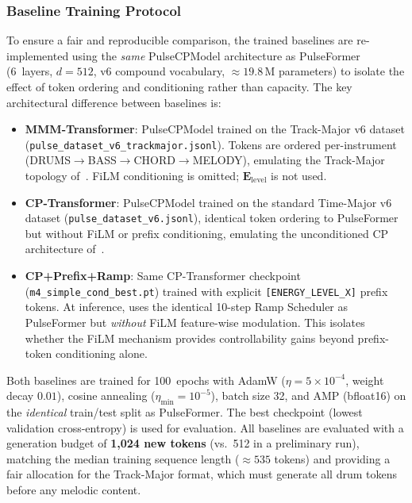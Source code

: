 \documentclass[pdflatex,sn-mathphys-num,twocolumn]{sn-jnl}
\theoremstyle{thmstyleone}
\theoremstyle{thmstyletwo}
\begin{document}
\subsubsection*{Baseline Training Protocol}
\label{sec:baseline_protocol}
To ensure a fair and reproducible comparison, the trained baselines are re-implemented using the \emph{same} PulseCPModel architecture as PulseFormer (6~layers, $d=512$, v6 compound vocabulary, $\approx\!19.8\,\mathrm{M}$ parameters) to isolate the effect of token ordering and conditioning rather than capacity. The key architectural difference between baselines is:

\begin{itemize}[nosep,leftmargin=*]
  \item \textbf{MMM-Transformer}: PulseCPModel trained on the Track-Major v6 dataset (\texttt{pulse\_dataset\_v6\_trackmajor.jsonl}). Tokens are ordered per-instrument (DRUMS$\to$BASS$\to$CHORD$\to$MELODY), emulating the Track-Major topology of~\cite{ens2020mmm}. FiLM conditioning is omitted; $\mathbf{E}_{\mathrm{level}}$ is not used.
  \item \textbf{CP-Transformer}: PulseCPModel trained on the standard Time-Major v6 dataset (\texttt{pulse\_dataset\_v6.jsonl}), identical token ordering to PulseFormer but without FiLM or prefix conditioning, emulating the unconditioned CP architecture of~\cite{hsiao2021compound}.
  \item \textbf{CP+Prefix+Ramp}: Same CP-Transformer checkpoint (\texttt{m4\_simple\_cond\_best.pt}) trained with explicit \texttt{[ENERGY\_LEVEL\_X]} prefix tokens. At inference, uses the identical 10-step Ramp Scheduler as PulseFormer but \emph{without} FiLM feature-wise modulation. This isolates whether the FiLM mechanism provides controllability gains beyond prefix-token conditioning alone.
\end{itemize}

Both baselines are trained for 100~epochs with AdamW ($\eta=5{\times}10^{-4}$, weight decay $0.01$), cosine annealing ($\eta_{\min}=10^{-5}$), batch size 32, and AMP (bfloat16) on the \emph{identical} train/test split as PulseFormer. The best checkpoint (lowest validation cross-entropy) is used for evaluation. All baselines are evaluated with a generation budget of \textbf{1{,}024 new tokens} (vs.\ 512 in a preliminary run), matching the median training sequence length ($\approx535$ tokens) and providing a fair allocation for the Track-Major format, which must generate all drum tokens before any melodic content.
\end{document}
